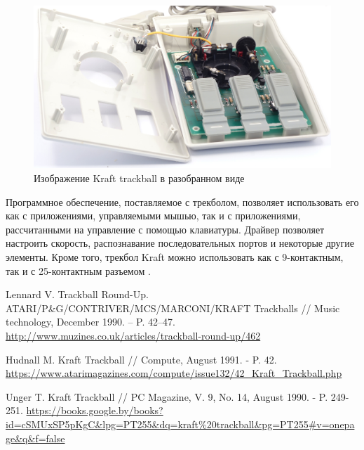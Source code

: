 \documentclass[11pt, a4paper]{article}
\begin{document}
\begin{figure}[h]
    \centering
    \includegraphics[scale=0.6]{1989_kraft_trackball/inside_30.jpg}
    \caption{Изображение Kraft trackball в разобранном виде}
    \label{fig:KraftInside}
\end{figure}

Программное обеспечение, поставляемое с трекболом, позволяет использовать его как с приложениями, управляемыми мышью, так и с приложениями, рассчитанными на управление с помощью клавиатуры. Драйвер позволяет настроить скорость, распознавание последовательных портов и некоторые другие элементы. Кроме того, трекбол Kraft можно использовать как с 9-контактным, так и с 25-контактным разъемом \cite{Hudnall}.

\begin{thebibliography}{9}
 Lennard V. Trackball Round-Up. ATARI/P\&G/CONTRIVER/MCS/MARCONI/KRAFT Trackballs // Music technology, December 1990. -- P. 42--47. \url{http://www.muzines.co.uk/articles/trackball-round-up/462}

 Hudnall M. Kraft Trackball // Compute, August 1991. - P. 42. \url{https://www.atarimagazines.com/compute/issue132/42_Kraft_Trackball.php}

 Unger T. Kraft Trackball // PC Magazine, V. 9, No. 14, August 1990. - P. 249-251. \url{https://books.google.by/books?id=cSMUxSP5pKgC&lpg=PT255&dq=kraft%20trackball&pg=PT255#v=onepage&q&f=false}
\end{thebibliography}
\end{document}
